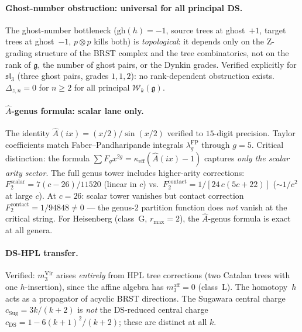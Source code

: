 \documentclass[11pt]{article}
\begin{document}
\paragraph{Ghost-number obstruction: universal for all principal DS.}
The ghost-number bottleneck ($\mathrm{gh}(h) = -1$, source trees at
ghost~$+1$, target trees at ghost~$-1$, $p \otimes p$ kills both)
is \emph{topological}: it depends only on the Z-grading structure
of the BRST complex and the tree combinatorics, not on the rank of
$\mathfrak{g}$, the number of ghost pairs, or the Dynkin grades.
Verified explicitly for $\mathfrak{sl}_3$ (three ghost pairs, grades
$1,1,2$): no rank-dependent obstruction exists.  $\Delta_{z,n} = 0$
for $n \ge 2$ for all principal $\mathcal{W}_k(\mathfrak{g})$.

\paragraph{$\hat{A}$-genus formula: scalar lane only.}  The identity
$\hat{A}(ix) = (x/2)/\sin(x/2)$ verified to $15$-digit precision.
Taylor coefficients match Faber--Pandharipande integrals
$\lambda_g^{\mathrm{FP}}$ through $g = 5$.  Critical distinction:
the formula $\sum F_g x^{2g} = \kappa_{\mathrm{eff}}(\hat{A}(ix)-1)$
captures \emph{only the scalar arity sector}.  The full genus tower
includes higher-arity corrections: $F_2^{\mathrm{scalar}} =
7(c-26)/11520$ (linear in $c$) vs.\
$F_2^{\mathrm{contact}} = 1/[24\,c(5c+22)]$ ($\sim 1/c^2$ at large
$c$).  At $c = 26$: scalar tower vanishes but contact correction
$F_2^{\mathrm{contact}} = 1/94848 \ne 0$ --- the genus-$2$ partition
function does \emph{not} vanish at the critical string.  For
Heisenberg (class~G, $r_{\max} = 2$), the $\hat{A}$-genus formula
is exact at all genera.

\paragraph{DS-HPL transfer.}  Verified: $m_3^{\mathrm{Vir}}$ arises
\emph{entirely} from HPL tree corrections (two Catalan trees with
one $h$-insertion), since the affine algebra has $m_3^{\mathrm{aff}}
= 0$ (class~L).  The homotopy~$h$ acts as a propagator of acyclic
BRST directions.  The Sugawara central charge
$c_{\mathrm{Sug}} = 3k/(k+2)$ is \emph{not} the DS-reduced central
charge $c_{\mathrm{DS}} = 1 - 6(k+1)^2/(k+2)$; these are distinct
at all $k$.
\end{document}

